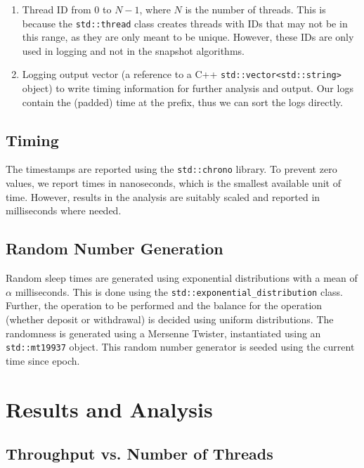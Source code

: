 \documentclass[conference,compsoc]{IEEEtran}
\begin{document}
\begin{enumerate}
    \item Thread ID from 0 to \(N - 1\), where \(N\) is the number of threads.
    This is because the \texttt{std::thread} class creates threads with IDs that
    may not be in this range, as they are only meant to be unique. However,
    these IDs are only used in logging and not in the snapshot algorithms.
    \item Logging output vector (a reference to a C++
    \texttt{std::vector<std::string>} object) to write timing information for
    further analysis and output. Our logs contain the (padded) time at the
    prefix, thus we can sort the logs directly.
\end{enumerate}

\subsection{Timing}
\label{subsec:timing}

The timestamps are reported using the \texttt{std::chrono} library. To prevent
zero values, we report times in nanoseconds, which is the smallest available
unit of time. However, results in the analysis are suitably scaled and reported
in milliseconds where needed.

\subsection{Random Number Generation}
\label{subsec:rng}

Random sleep times are generated using exponential distributions with a mean of
\(\alpha\) milliseconds. This is done using the
\texttt{std::exponential\_distribution} class. Further, the operation to be
performed and the balance for the operation (whether deposit or withdrawal) is
decided using uniform distributions. The randomness is generated using a
Mersenne Twister, instantiated using an \texttt{std::mt19937} object. This
random number generator is seeded using the current time since epoch.

\section{Results and Analysis}
\label{sec:results}

\subsection{Throughput vs. Number of Threads}
\end{document}
